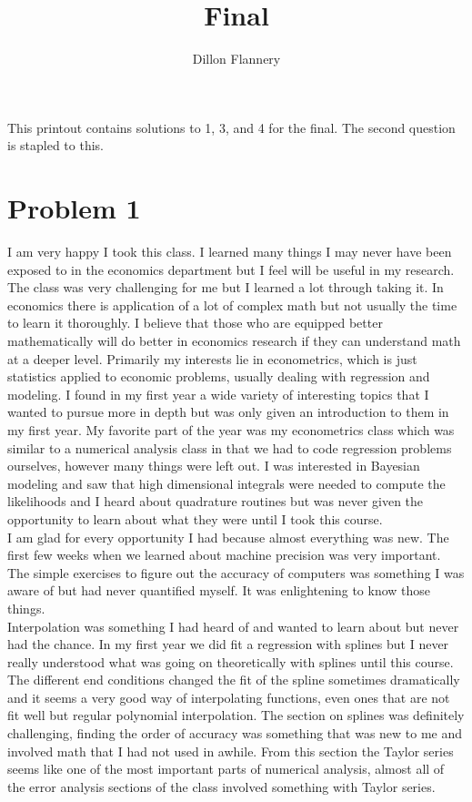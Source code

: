 \documentclass[]{article}
\title{Final}
\author{Dillon Flannery}
\begin{document}
\maketitle
This printout contains solutions to 1, 3, and 4 for the final. The second question is stapled to this. 
\section*{Problem 1}
I am  very happy I took this class. I learned many things I may never have been exposed to in the economics department but I feel will be useful in my research. The class was very challenging for me but I learned a lot through taking it. In economics there is application of a lot of complex math but not usually the time to learn it  thoroughly. I believe that those who are equipped better mathematically will do better in economics research if they can understand math at a deeper level. Primarily my interests lie in econometrics, which is just statistics applied to economic problems, usually dealing with regression and modeling. I found in my first year a wide variety of interesting topics that I wanted to pursue more in depth but was only given an introduction to them in my first year. My favorite part of the year was my econometrics class which was similar to a numerical analysis class in that we had to code regression problems ourselves, however many things were left out. I was interested in Bayesian modeling and saw that high dimensional integrals were needed to compute the likelihoods and I heard about quadrature routines but was never given the opportunity to learn about what they were until I took this course. \\
I am glad for every opportunity I had because almost everything was new. The first few weeks when we learned about machine precision was very important. The simple exercises to figure out the accuracy of computers was something I was aware of but had never quantified myself. It was enlightening to know those things. \\
Interpolation was something I had heard of and wanted to learn about but never had the chance. In my first year we did fit a  regression with splines but I never really understood what was going on theoretically with splines until this course. The different end conditions changed the fit of the spline sometimes dramatically and it seems a very good way of interpolating functions, even ones that are not fit well but regular polynomial interpolation. The section on splines was definitely challenging, finding the order of accuracy was something that was new to me and involved math that I had not used in awhile. From this section the Taylor series seems like one of the most important parts of numerical analysis, almost all of the error analysis sections of the class involved something with Taylor series. \\
\end{document}

